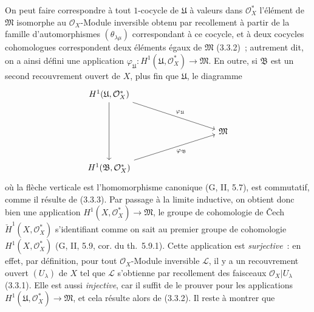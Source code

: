 \begin{env}[5.4.7]
On peut faire correspondre à tout $1$-cocycle de $\mathfrak{U}$ à valeurs
dans $\mathcal{O}_X^*$ l'élément de $\mathfrak{M}$ isomorphe au
$\mathcal{O}_X$-Module inversible obtenu par recollement à partir de la
famille d'automorphismes $(\theta_{\lambda\mu})$ correspondant à ce cocycle,
et à deux cocycles cohomologues correspondent deux éléments égaux de
$\mathfrak{M}$ (3.3.2)~; autrement dit, on a ainsi défini une application
$\varphi_{\mathfrak{U}}:H^1(\mathfrak{U},\mathcal{O}_X^*)\to\mathfrak{M}$.
En outre, si $\mathfrak{B}$ est un second recouvrement ouvert de $X$, plus fin
que $\mathfrak{U}$, le diagramme
\[
\begin{tikzcd}[column sep=huge,row sep=large]
H^1(\mathfrak{U},\mathcal{O}_X^*)
  \arrow[dd]
  \arrow[rrd,"\varphi_{\mathfrak{U}}"] & & \\
& & \mathfrak{M} \\
H^1(\mathfrak{B},\mathcal{O}_X^*)
  \arrow[rru,swap,"\varphi_{\mathfrak{B}}"] & &
\end{tikzcd}
\]
où la flèche verticale est l'homomorphisme canonique (G, II, 5.7), est
commutatif, comme il résulte de (3.3.3). Par passage à la limite inductive, on
obtient donc bien une application
$H^1(X,\mathcal{O}_X^*)\to\mathfrak{M}$, le groupe de cohomologie de \v{C}ech
$\check{H}^1(X,\mathcal{O}_X^*)$ s'identifiant comme on sait au premier groupe
de cohomologie $H^1(X,\mathcal{O}_X^*)$ (G, II, 5.9, cor. du th.~5.9.1).
Cette application est \emph{surjective}~: en effet, par définition, pour tout
$\mathcal{O}_X$-Module inversible $\mathcal{L}$, il y a un recouvrement ouvert
$(U_\lambda)$ de $X$ tel que $\mathcal{L}$ s'obtienne par recollement des
faisceaux $\mathcal{O}_X|U_\lambda$ (3.3.1). Elle est aussi
\emph{injective}, car il suffit de le prouver pour les applications
$H^1(\mathfrak{U},\mathcal{O}_X^*)\to\mathfrak{M}$, et cela résulte alors de
(3.3.2). Il reste à montrer que



\end{env}
